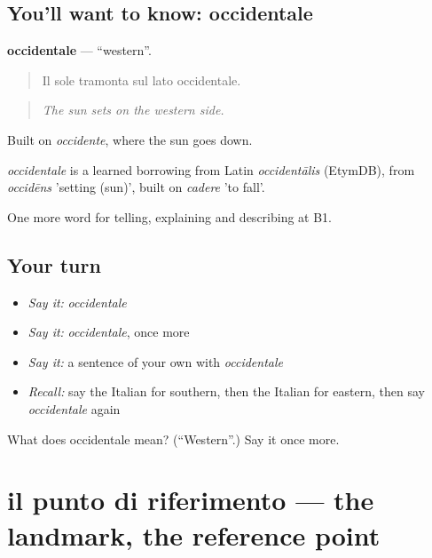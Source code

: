 \subsection*{You'll want to know: occidentale}
\textbf{occidentale} — \textquotedblleft{}western\textquotedblright{}.

\begin{quote}
Il sole tramonta sul lato occidentale.
\end{quote}

\begin{quote}
\emph{The sun sets on the western side.}
\end{quote}

Built on \emph{occidente}, where the sun goes down.

\begin{cousinweb}
\emph{occidentale} is a learned borrowing from Latin \emph{occidentālis} (EtymDB), from \emph{occidēns} 'setting (sun)', built on \emph{cadere} 'to fall'.
\end{cousinweb}

\begin{grammarlens}[title={What you've built}]
One more word for telling, explaining and describing at B1.
\end{grammarlens}

\subsection*{Your turn}
\begin{itemize}
\raggedright
  \item \emph{Say it:} \emph{occidentale}
  \item \emph{Say it:} \emph{occidentale}, once more
  \item \emph{Say it:} a sentence of your own with \emph{occidentale}
  \item \emph{Recall:} say the Italian for southern, then the Italian for eastern, then say \emph{occidentale} again
\end{itemize}

\begin{tcolorbox}[breakable,colback=teal!4,colframe=teal!35!black,title={Before you move on}]
What does occidentale mean? (\textquotedblleft{}Western\textquotedblright{}.) Say it once more.
\end{tcolorbox}
\section[il punto di riferimento]{il punto di riferimento — the landmark, the reference point}

